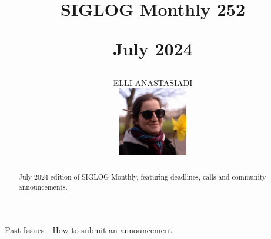 \documentclass[prodmode,acmtecs]{acmsmall} %
\newcounter{colstart}
\begin{document}
\setcounter{colstart}{\thepage}

\title{{\huge\sc SIGLOG Monthly 252}

 July 2024}\author{ELLI ANASTASIADI\vspace*{-2.6cm}\begin{flushright}\includegraphics[width=30mm]{elli_anastasiadi.png}\end{flushright}}\begin{abstract}July 2024 edition of SIGLOG Monthly, featuring deadlines, calls and community announcements.
\end{abstract}


\maketitlee

\href{https://lics.siglog.org/newsletters/}{Past Issues}
 - 
\href{https://lics.siglog.org/newsletters/inst.html}{How to submit an announcement}
\end{document}
